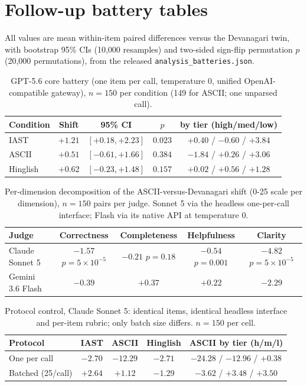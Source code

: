 \section{Follow-up battery tables}
\label{app:followup}

All values are mean within-item paired differences versus the Devanagari twin, with bootstrap 95\% CIs (10{,}000 resamples) and two-sided sign-flip permutation $p$ (20{,}000 permutations), from the released \texttt{analysis\_batteries.json}.

\begin{table}[H]
\centering\small
\caption{GPT-5.6 core battery (one item per call, temperature 0, unified OpenAI-compatible gateway), $n{=}150$ per condition (149 for ASCII; one unparsed call).}
\begin{tabular}{lcccc}
\toprule
Condition & Shift & 95\% CI & $p$ & by tier (high/med/low) \\
\midrule
IAST & $+1.21$ & $[+0.18, +2.23]$ & $0.023$ & $+0.40$ / $-0.60$ / $+3.84$ \\
ASCII & $+0.51$ & $[-0.61, +1.66]$ & $0.384$ & $-1.84$ / $+0.26$ / $+3.06$ \\
Hinglish & $+0.62$ & $[-0.23, +1.48]$ & $0.157$ & $+0.02$ / $+0.56$ / $+1.28$ \\
\bottomrule
\end{tabular}
\end{table}

\begin{table}[H]
\centering\small
\caption{Per-dimension decomposition of the ASCII-versus-Devanagari shift (0-25 scale per dimension), $n{=}150$ pairs per judge. Sonnet 5 via the headless one-per-call interface; Flash via its native API at temperature 0.}
\begin{tabular}{lcccc}
\toprule
Judge & Correctness & Completeness & Helpfulness & Clarity \\
\midrule
Claude Sonnet 5 & $-1.57$ {\scriptsize$p{=}5{\times}10^{-5}$} & $-0.21$ {\scriptsize$p{=}0.18$} & $-0.54$ {\scriptsize$p{=}0.001$} & $-4.82$ {\scriptsize$p{=}5{\times}10^{-5}$} \\
Gemini 3.6 Flash & $-0.39$ & $+0.37$ & $+0.22$ & $-2.29$ \\
\bottomrule
\end{tabular}
\end{table}

\begin{table}[H]
\centering\small
\caption{Protocol control, Claude Sonnet 5: identical items, identical headless interface and per-item rubric; only batch size differs. $n{=}150$ per cell.}
\begin{tabular}{lcccc}
\toprule
Protocol & IAST & ASCII & Hinglish & ASCII by tier (h/m/l) \\
\midrule
One per call & $-2.70$ & $-12.29$ & $-2.71$ & $-24.28$ / $-12.96$ / $+0.38$ \\
Batched (25/call) & $+2.64$ & $+1.12$ & $-1.29$ & $-3.62$ / $+3.48$ / $+3.50$ \\
\bottomrule
\end{tabular}
\end{table}

